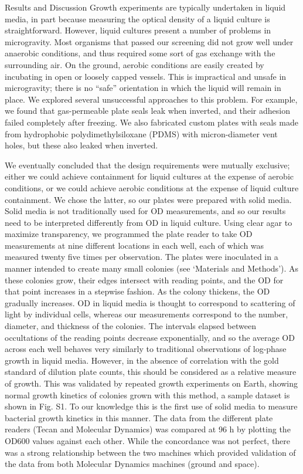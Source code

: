 Results and Discussion
Growth experiments are typically undertaken in liquid media, in part because measuring the optical density of a liquid culture is straightforward. However, liquid cultures present a number of problems in microgravity. Most organisms that passed our screening did not grow well under anaerobic conditions, and thus required some sort of gas exchange with the surrounding air. On the ground, aerobic conditions are easily created by incubating in open or loosely capped vessels. This is impractical and unsafe in microgravity; there is no “safe” orientation in which the liquid will remain in place. We explored several unsuccessful approaches to this problem. For example, we found that gas-permeable plate seals leak when inverted, and their adhesion failed completely after freezing. We also fabricated custom plates with seals made from hydrophobic polydimethylsiloxane (PDMS) with micron-diameter vent holes, but these also leaked when inverted.

We eventually concluded that the design requirements were mutually exclusive; either we could achieve containment for liquid cultures at the expense of aerobic conditions, or we could achieve aerobic conditions at the expense of liquid culture containment. We chose the latter, so our plates were prepared with solid media. Solid media is not traditionally used for OD measurements, and so our results need to be interpreted differently from OD in liquid culture. Using clear agar to maximize transparency, we programmed the plate reader to take OD measurements at nine different locations in each well, each of which was measured twenty five times per observation. The plates were inoculated in a manner intended to create many small colonies (see ‘Materials and Methods’). As these colonies grow, their edges intersect with reading points, and the OD for that point increases in a stepwise fashion. As the colony thickens, the OD gradually increases. OD in liquid media is thought to correspond to scattering of light by individual cells, whereas our measurements correspond to the number, diameter, and thickness of the colonies. The intervals elapsed between occultations of the reading points decrease exponentially, and so the average OD across each well behaves very similarly to traditional observations of log-phase growth in liquid media. However, in the absence of correlation with the gold standard of dilution plate counts, this should be considered as a relative measure of growth. This was validated by repeated growth experiments on Earth, showing normal growth kinetics of colonies grown with this method, a sample dataset is shown in Fig. S1. To our knowledge this is the first use of solid media to measure bacterial growth kinetics in this manner. The data from the different plate readers (Tecan and Molecular Dynamics) was compared at 96 h by plotting the OD600 values against each other. While the concordance was not perfect, there was a strong relationship between the two machines which provided validation of the data from both Molecular Dynamics machines (ground and space).

